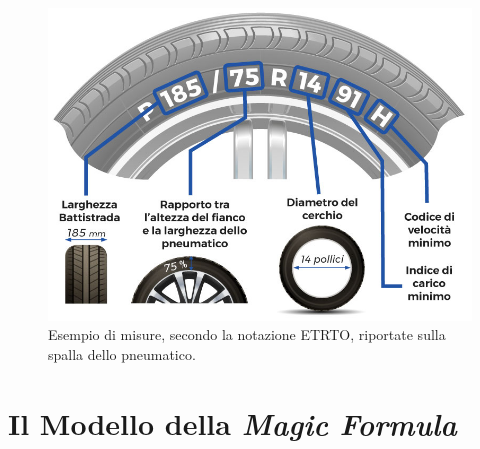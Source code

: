 \begin{figure}[h]
	\centering
	\includegraphics[width=0.7\linewidth]{Figures/tire_measures}
	\caption{Esempio di misure, secondo la notazione \ac{ETRTO}, riportate sulla spalla dello pneumatico.}
	\label{tiremeasures}
\end{figure}
%
\section{Il Modello della \textit{Magic Formula}}
%
